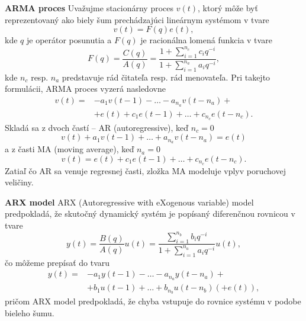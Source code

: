 \textbf{ARMA proces} 
\newline
Uvažujme stacionárny proces $v(t)$, ktorý môže byť reprezentovaný ako biely šum prechádzajúci lineárnym systémom v tvare 
\begin{equation}
	v(t) = F(q)e(t),
\end{equation}
kde $q$ je operátor posunutia a $F(q)$ je racionálna lomená funkcia v tvare 
\begin{equation}
	F(q) = \frac{C(q)}{A(q)} = \frac{1 + \sum_{i=1}^{n_c} c_{i}q^{-i}}{1 + \sum_{i=1}^{n_a} a_{i}q^{-i}},
\end{equation}
kde $n_c$ resp. $n_a$ predstavuje rád čitateľa resp. rád menovateľa. Pri takejto formulácii, ARMA proces vyzerá nasledovne 
\begin{equation}
	\begin{split}
			v(t) = &-a_{1}v(t-1) - \dots -a_{n_a}v(t-n_a) + \\
				   &+e(t) + c_1e(t-1) + \dots + c_{n_c}e(t-n_c).
	\end{split} 
\end{equation}
Skladá sa z dvoch častí -- AR (autoregressive), keď $n_c = 0$
\begin{equation}
	v(t) + a_{1}v(t-1) + \dots + a_{n_a}v(t-n_a) = e(t)
\end{equation}
a z časti MA (moving average), keď $n_a = 0$
\begin{equation}
	v(t) = e(t) + c_1e(t-1) + \dots + c_{n_c}e(t-n_c).
\end{equation}
Zatiaľ čo AR sa venuje regresnej časti, zložka MA modeluje vplyv poruchovej veličiny.
 
\textbf{ARX model}
\newline
 ARX (Autoregressive with eXogenous variable) model predpokladá, že skutočný dynamický systém je popísaný diferenčnou rovnicou v tvare
 \begin{equation}
 	y(t) = \frac{B(q)}{A(q)}u(t) = \frac{\sum_{i=1}^{n_b} b_{i}q^{-i}}{1 + \sum_{i=1}^{n_a} a_{i}q^{-i}}u(t),
 \end{equation}
 čo môžeme prepísať do tvaru 
 \begin{equation}
	 \begin{split}
		 y(t) = &- a_{1}y(t-1) - \dots - a_{n_a}y(t-n_a) + \\
		 		&+ b_{1}u(t-1) + \dots + b_{n_b}u(t-n_b) \left(+ e(t)\right), 
	 \end{split}
	 \label{eq:ARX_m} 
 \end{equation}
 pričom ARX model predpokladá, že chyba vstupuje do rovnice systému v podobe bieleho šumu.
 
